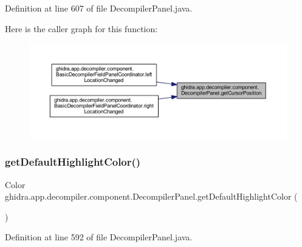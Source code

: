 Definition at line 607 of file Decompiler\+Panel.\+java.

Here is the caller graph for this function\+:
\nopagebreak
\begin{figure}[H]
\begin{center}
\leavevmode
\includegraphics[width=350pt]{classghidra_1_1app_1_1decompiler_1_1component_1_1_decompiler_panel_ad986829e7678aec3ef2f493d389f7ac1_icgraph}
\end{center}
\end{figure}
\mbox{\label{classghidra_1_1app_1_1decompiler_1_1component_1_1_decompiler_panel_a31b55910dd10b4b190eb729fcea60eb3}} 
\subsubsection{\texorpdfstring{getDefaultHighlightColor()}{getDefaultHighlightColor()}}
{\footnotesize\ttfamily Color ghidra.\+app.\+decompiler.\+component.\+Decompiler\+Panel.\+get\+Default\+Highlight\+Color (\begin{DoxyParamCaption}{ }\end{DoxyParamCaption})\hspace{0.3cm}{\ttfamily [inline]}}



Definition at line 592 of file Decompiler\+Panel.\+java.

